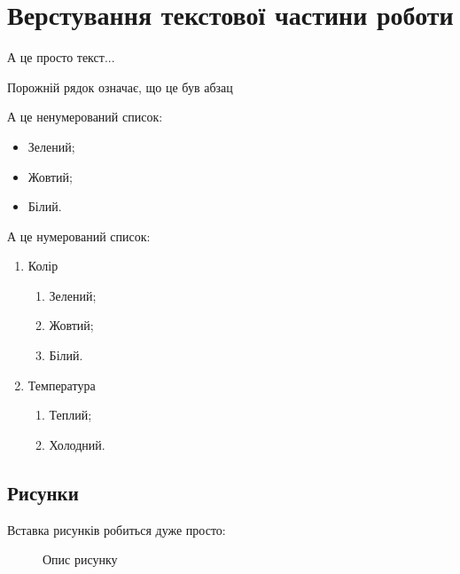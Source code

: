 \chapter{Верстування текстової частини роботи}
А це просто текст...

Порожній рядок означає, що це був абзац

\lipsum[2-4]

А це ненумерований список:
\begin{itemize}
\item Зелений;
\item Жовтий;
\item Білий.
\end{itemize}

А це нумерований список:
\begin{enumerate}
\item Колір
      \begin{enumerate}
      \item Зелений;
      \item Жовтий;
      \item Білий.
      \end{enumerate}	
\item Температура
      \begin{enumerate}
      \item Теплий;
      \item Холодний.
      \end{enumerate}
\end{enumerate}
 

\section{Рисунки}

Вставка рисунків робиться дуже просто:

\begin{figure}[h]
\caption{Опис рисунку}
\end{figure}

